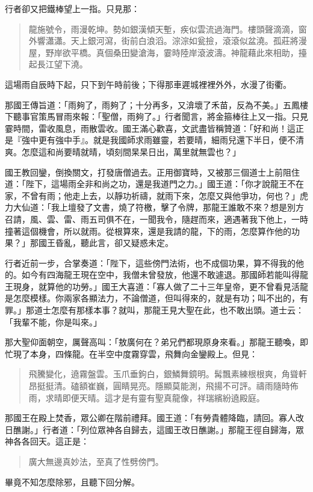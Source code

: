 行者卻又把鐵棒望上一指。只見那：
\begin{quote}
龍施號令，雨漫乾坤。勢如銀漢傾天塹，疾似雲流過海門。樓頭聲滴滴，窗外響瀟瀟。天上銀河瀉，街前白浪滔。淙淙如瓮撿，滾滾似盆澆。孤莊將漫屋，野岸欲平橋。真個桑田變滄海，霎時陸岸滾波濤。神龍藉此來相助，擡起長江望下澆。
\end{quote}

這場雨自辰時下起，只下到午時前後；下得那車遲城裡裡外外，水漫了街衢。

那國王傳旨道：「雨夠了，雨夠了；十分再多，又渰壞了禾苗，反為不美。」五鳳樓下聽事官策馬冒雨來報：「聖僧，雨夠了。」行者聞言，將金箍棒往上又一指。只見霎時間，雷收風息，雨散雲收。國王滿心歡喜，文武盡皆稱贊道：「好和尚！這正是『強中更有強中手』。就是我國師求雨雖靈，若要晴，細雨兒還下半日，便不清爽。怎麼這和尚要晴就晴，頃刻間杲杲日出，萬里就無雲也？」

國王教回鑾，倒換關文，打發唐僧過去。正用御寶時，又被那三個道士上前阻住道：「陛下，這場雨全非和尚之功，還是我道門之力。」國王道：「你才說龍王不在家，不曾有雨；他走上去，以靜功祈禱，就雨下來，怎麼又與他爭功，何也？」虎力大仙道：「我上壇發了文書，燒了符檄，擊了令牌，那龍王誰敢不來？想是別方召請，風、雲、雷、雨五司俱不在，一聞我令，隨趕而來，適遇著我下他上，一時撞著這個機會，所以就雨。從根算來，還是我請的龍，下的雨，怎麼算作他的功果？」那國王昏亂，聽此言，卻又疑惑未定。

行者近前一步，合掌奏道：「陛下，這些傍門法術，也不成個功果，算不得我的他的。如今有四海龍王現在空中，我僧未曾發放，他還不敢遽退。那國師若能叫得龍王現身，就算他的功勞。」國王大喜道：「寡人做了二十三年皇帝，更不曾看見活龍是怎麼模樣。你兩家各顯法力，不論僧道，但叫得來的，就是有功；叫不出的，有罪。」那道士怎麼有那樣本事？就叫，那龍王見大聖在此，也不敢出頭。道士云：「我輩不能，你是叫來。」

那大聖仰面朝空，厲聲高叫：「敖廣何在？弟兄們都現原身來看。」那龍王聽喚，即忙現了本身，四條龍。在半空中度霧穿雲，飛舞向金鑾殿上。但見：
\begin{quote}
飛騰變化，遶霧盤雲。玉爪垂鉤白，銀鱗舞鏡明。髯飄素練根根爽，角聳軒昂挺挺清。磕額崔巍，圓睛晃亮。隱顯莫能測，飛揚不可評。禱雨隨時佈雨，求晴即便天晴。這才是有靈有聖真龍像，祥瑞繽紛遶殿庭。
\end{quote}

那國王在殿上焚香，眾公卿在階前禮拜。國王道：「有勞貴體降臨，請回。寡人改日醮謝。」行者道：「列位眾神各自歸去，這國王改日醮謝。」那龍王徑自歸海，眾神各各回天。這正是：
\begin{quote}
廣大無邊真妙法，至真了性劈傍門。
\end{quote}

畢竟不知怎麼除邪，且聽下回分解。
